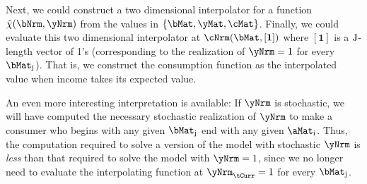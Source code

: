 \documentclass[./SolvingMicroDSOPs]{subfiles}
\begin{document}
{		Next, we could construct a two dimensional interpolator for a function $\hat{\chi}(\bNrm,\yNrm)$ from the values in $\{\bMat,\yMat,\cMat\}$.  Finally, we could evaluate this two dimensional interpolator at $\mathfrak{\cNrm}(\bMat,[\mathbf{1}])$ where $[\mathbf{1}]$ is a $\mathrm{J}$-length vector of 1's (corresponding to the realization of $\yNrm=1$ for every $\bMat_{\bIdx}$).  That is, we construct the consumption function as the interpolated value when income takes its expected value.
		
		An even more interesting interpretation is available:  If $\yNrm$ is stochastic, we will have computed the necessary stochastic realization of $\yNrm$ to make a consumer who begins with any given $\bMat_{\bIdx}$ end with any given $\aMat_{\aIdx}$.  Thus, the computation required to solve a version of the model with stochastic $\yNrm$ is \textit{less} than that required to solve the model with $\yNrm=1$, since we no longer need to evaluate the interpolating function at $\yNrm_{\tCurr}=1$ for every $\bMat_{\bIdx}$.
	} %
	
\end{document}
